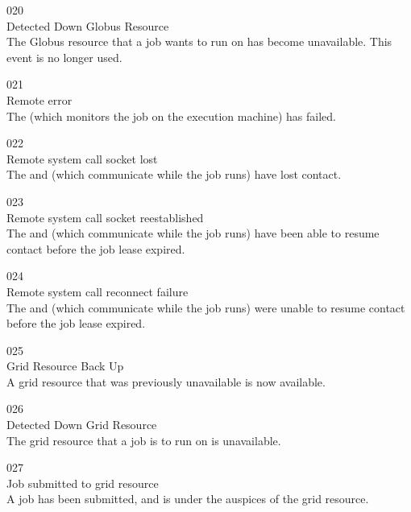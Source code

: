 \noindent{} 020 \\
 Detected Down Globus Resource \\
 The Globus resource that a job wants to run
on has become unavailable. 
This event is no longer used.

\noindent{} 021 \\
 Remote error \\
 The  (which monitors the job
on the execution machine) has failed.

\noindent{} 022 \\
 Remote system call socket lost \\
 The  and 
(which communicate while the job runs) have lost contact.

\noindent{} 023 \\
 Remote system call socket reestablished \\
 The  and 
(which communicate while the job runs) have been able to resume
contact before the job lease expired.

\noindent{} 024 \\
 Remote system call reconnect failure \\
 The  and 
(which communicate while the job runs) were unable to resume
contact before the job lease expired.

\noindent{} 025 \\
 Grid Resource Back Up \\
 A grid resource that was previously
unavailable is now available.

\noindent{} 026 \\
 Detected Down Grid Resource \\
 The grid resource that a job is to
run on is unavailable.

\noindent{} 027 \\
 Job submitted to grid resource \\
 A job has been submitted,
and is under the auspices of the grid resource.

